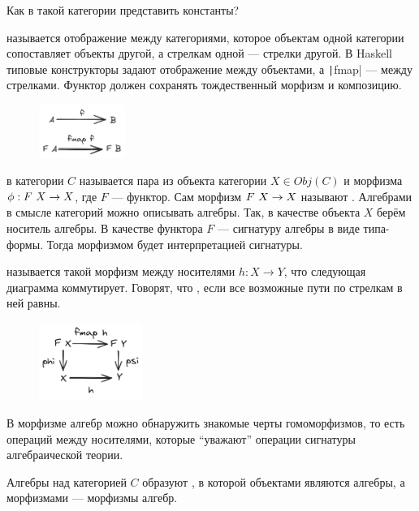 \begin{task}
    Как в такой категории представить константы?
\end{task}

 называется отображение между категориями, которое объектам одной категории сопоставляет объекты другой, а стрелкам одной --- стрелки другой.
В Haskell типовые конструкторы задают отображение между объектами, а \texttt|fmap| --- между стрелками.
Функтор должен сохранять тождественный морфизм и композицию.
\begin{figure}[h!]
    \centering
    \includegraphics[width=0.25\textwidth]{figs/functor}
\end{figure}

 в категории $C$ называется пара из объекта категории $X \in Obj(C)$ и морфизма $\phi : F~ X \to X$, где $F$ --- функтор.
Сам морфизм $F~ X \to X$ называют .
Алгебрами в смысле категорий можно описывать алгебры.
Так, в качестве объекта $X$ берём носитель алгебры.
В качестве функтора $F$ --- сигнатуру алгебры в виде типа-формы.
Тогда морфизмом будет интерпретацией сигнатуры.

 называется такой морфизм между носителями $h : X \to Y$, что следующая диаграмма коммутирует.
Говорят, что , если все возможные пути по стрелкам в ней равны.
\begin{figure}[h!]
    \centering
    \includegraphics[width=0.3\textwidth]{figs/alg-homomorphism}
\end{figure}

В морфизме алгебр можно обнаружить знакомые черты гомоморфизмов, то есть операций между носителями, которые ``уважают'' операции сигнатуры алгебраической теории.

Алгебры над категорией $C$ образуют , в которой объектами являются алгебры, а морфизмами --- морфизмы алгебр.

